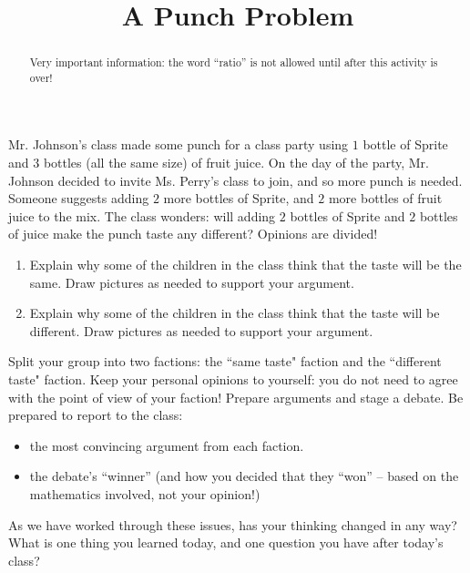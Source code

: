 \documentclass[nooutcomes,noauthor,handout]{ximera}
\title{A Punch Problem}
\begin{document}
\begin{abstract}
    Very important information: the word ``ratio'' is not allowed until after this activity is over!
\end{abstract}

\maketitle

Mr. Johnson's class made some punch for a class party using $1$ bottle of Sprite and $3$ bottles (all the same size) of fruit juice.  On the day of the party, Mr. Johnson decided to invite Ms. Perry's class to join, and so more punch is needed.  Someone suggests adding $2$ more bottles of Sprite, and $2$ more bottles of fruit juice to the mix.  The class wonders: will adding $2$ bottles of Sprite and $2$ bottles of juice make the punch taste any different?  Opinions are divided!

\begin{problem}
\begin{enumerate}
    \item Explain why some of the children in the class think that the taste will be the same.  Draw pictures as needed to support your argument.
    \item Explain why some of the children in the class think that the taste will be different.  Draw pictures as needed to support your argument.
\end{enumerate}
\end{problem}

\begin{problem}
Split your group into two factions: the ``same taste" faction and the ``different taste" faction.  Keep your personal opinions to yourself: you do not need to agree with the point of view of your faction!  Prepare arguments and stage a debate.  Be prepared to report to the class:
\begin{itemize}
    \item the most convincing argument from each faction.
    \item the debate's ``winner'' (and how you decided that they ``won'' -- based on the mathematics involved, not your opinion!)
\end{itemize}
\end{problem}

\begin{problem}
As we have worked through these issues, has your thinking changed in any way?  What is one thing you learned today, and one question you have after today's class?
\end{problem}
\end{document}
